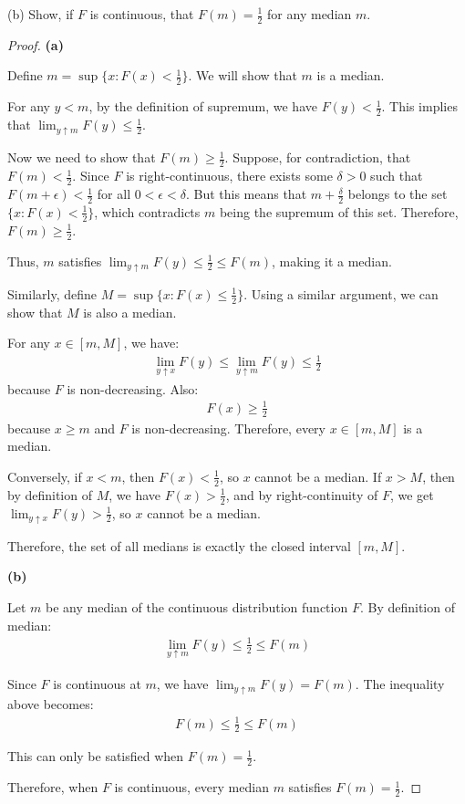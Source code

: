 \documentclass[letterpaper, 11pt]{article}
\newcommand{\1}{\mathds{1}}	%
\theoremstyle{definition}
\begin{document}
(b) Show, if $F$ is continuous, that $F(m)=\frac{1}{2}$ for any median $m$.
\begin{proof}
    \textbf{(a)}

Define $m = \sup\{x : F(x) < \frac{1}{2}\}$. We will show that $m$ is a median.

For any $y < m$, by the definition of supremum, we have $F(y) < \frac{1}{2}$. This implies that $\lim_{y \uparrow m} F(y) \leq \frac{1}{2}$.

Now we need to show that $F(m) \geq \frac{1}{2}$. Suppose, for contradiction, that $F(m) < \frac{1}{2}$. Since $F$ is right-continuous, there exists some $\delta > 0$ such that $F(m+\epsilon) < \frac{1}{2}$ for all $0 < \epsilon < \delta$. But this means that $m + \frac{\delta}{2}$ belongs to the set $\{x : F(x) < \frac{1}{2}\}$, which contradicts $m$ being the supremum of this set. Therefore, $F(m) \geq \frac{1}{2}$.

Thus, $m$ satisfies $\lim_{y \uparrow m} F(y) \leq \frac{1}{2} \leq F(m)$, making it a median.

Similarly, define $M = \sup\{x : F(x) \leq \frac{1}{2}\}$. Using a similar argument, we can show that $M$ is also a median.

For any $x \in [m, M]$, we have:
\begin{align*}
\lim_{y \uparrow x} F(y) \leq \lim_{y \uparrow m} F(y) \leq \frac{1}{2}
\end{align*}
because $F$ is non-decreasing. Also:
\begin{align*}
F(x) \geq \frac{1}{2}
\end{align*}
because $x \geq m$ and $F$ is non-decreasing. Therefore, every $x \in [m, M]$ is a median.

Conversely, if $x < m$, then $F(x) < \frac{1}{2}$, so $x$ cannot be a median. If $x > M$, then by definition of $M$, we have $F(x) > \frac{1}{2}$, and by right-continuity of $F$, we get $\lim_{y \uparrow x} F(y) > \frac{1}{2}$, so $x$ cannot be a median.

Therefore, the set of all medians is exactly the closed interval $[m, M]$.

\textbf{(b)}

Let $m$ be any median of the continuous distribution function $F$. By definition of median:
\begin{align*}
\lim_{y \uparrow m} F(y) \leq \frac{1}{2} \leq F(m)
\end{align*}

Since $F$ is continuous at $m$, we have $\lim_{y \uparrow m} F(y) = F(m)$. The inequality above becomes:
\begin{align*}
F(m) \leq \frac{1}{2} \leq F(m)
\end{align*}

This can only be satisfied when $F(m) = \frac{1}{2}$.

Therefore, when $F$ is continuous, every median $m$ satisfies $F(m) = \frac{1}{2}$.
    \end{proof}
\end{document}

